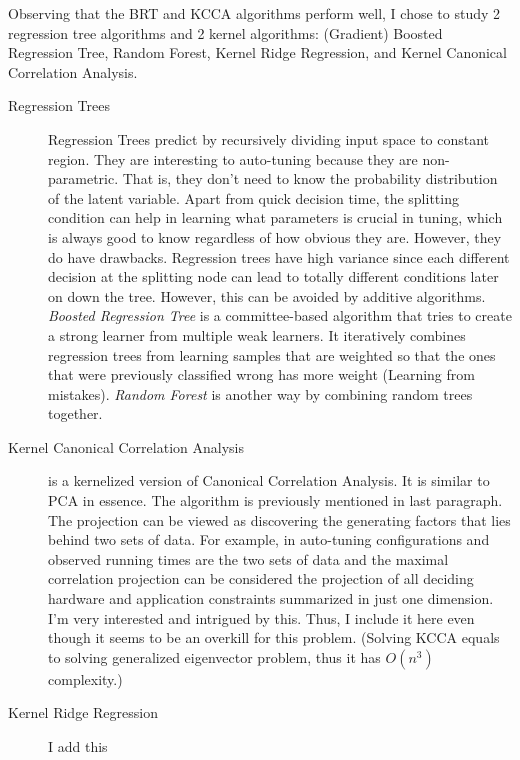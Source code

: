 Observing that the BRT and KCCA algorithms perform well, I chose to study 2 regression tree algorithms and 2 kernel algorithms: (Gradient) Boosted Regression Tree, Random Forest, Kernel Ridge Regression, and Kernel Canonical Correlation Analysis.
\begin{description}
\item[Regression Trees] Regression Trees predict by recursively dividing input space to constant region. They are interesting to auto-tuning because they are non-parametric. That is, they don't need to know the probability distribution of the latent variable. Apart from quick decision time, the splitting condition can help in learning what parameters is crucial in tuning, which is always good to know regardless of how obvious they are. However, they do have drawbacks. Regression trees have high variance since each different decision at the splitting node can lead to totally different conditions later on down the tree. However, this can be avoided by additive algorithms. \emph{Boosted Regression Tree} is a committee-based algorithm that tries to create a strong learner from multiple weak learners. It iteratively combines regression trees from learning samples that are weighted so that the ones that were previously classified wrong has more weight (Learning from mistakes). \emph{Random Forest} is another way by combining random trees together.
\item[Kernel Canonical Correlation Analysis] is a kernelized version of Canonical Correlation Analysis.\cite{KICA} It is similar to PCA in essence. The algorithm is previously mentioned in last paragraph. The projection can be viewed as discovering the generating factors that lies behind two sets of data. For example, in auto-tuning configurations and observed running times are the two sets of data and the maximal correlation projection can be considered the projection of all deciding hardware and application constraints summarized in just one dimension. I'm very interested and intrigued by this. Thus, I include it here even though it seems to be an overkill for this problem. (Solving KCCA equals to solving generalized eigenvector problem, thus it has $O(n^3)$ complexity.)
\item[Kernel Ridge Regression] I add this
\end{description}



